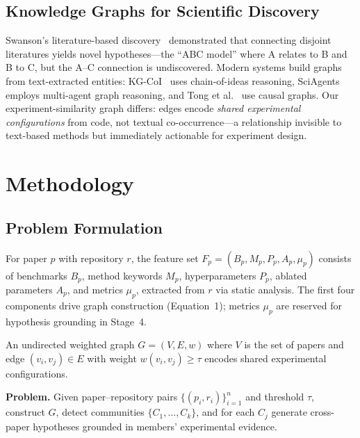 \documentclass[conference]{IEEEtran}
\begin{document}
\subsection{Knowledge Graphs for Scientific Discovery}

Swanson's literature-based discovery~\cite{swanson1986} demonstrated that connecting disjoint literatures yields novel hypotheses---the ``ABC model'' where A relates to B and B to C, but the A--C connection is undiscovered.
Modern systems build graphs from text-extracted entities: KG-CoI~\cite{xiong2024kgcoi} uses chain-of-ideas reasoning, SciAgents~\cite{ghafarollahi2024sciagents} employs multi-agent graph reasoning, and Tong et al.~\cite{tong2024causal} use causal graphs.
Our experiment-similarity graph differs: edges encode \emph{shared experimental configurations} from code, not textual co-occurrence---a relationship invisible to text-based methods but immediately actionable for experiment design.


\section{Methodology}

\subsection{Problem Formulation}

\begin{definition}
For paper $p$ with repository $r$, the feature set $F_p = (B_p, M_p, P_p, A_p, \mu_p)$ consists of benchmarks $B_p$, method keywords $M_p$, hyperparameters $P_p$, ablated parameters $A_p$, and metrics $\mu_p$, extracted from $r$ via static analysis.
The first four components drive graph construction (Equation~1); metrics $\mu_p$ are reserved for hypothesis grounding in Stage~4.
\end{definition}

\begin{definition}
An undirected weighted graph $G = (V, E, w)$ where $V$ is the set of papers and edge $(v_i, v_j) \in E$ with weight $w(v_i, v_j) \geq \tau$ encodes shared experimental configurations.
\end{definition}

\noindent\textbf{Problem.} Given paper--repository pairs $\{(p_i, r_i)\}_{i=1}^{n}$ and threshold $\tau$, construct $G$, detect communities $\{C_1, \ldots, C_k\}$, and for each $C_j$ generate cross-paper hypotheses grounded in members' experimental evidence.
\end{document}
